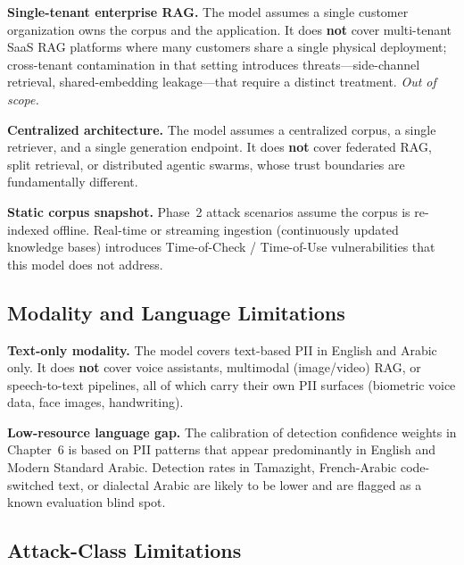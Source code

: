 \documentclass[a4paper,12pt]{report}
\begin{document}
\begin{limitbox}
\textbf{Single-tenant enterprise RAG.} The model assumes a single customer
organization owns the corpus and the application. It does \textbf{not}
cover multi-tenant SaaS RAG platforms where many customers share a single
physical deployment; cross-tenant contamination in that setting introduces
threats---side-channel retrieval, shared-embedding leakage---that require
a distinct treatment. \emph{Out of scope.}

\textbf{Centralized architecture.} The model assumes a centralized
corpus, a single retriever, and a single generation endpoint. It does
\textbf{not} cover federated RAG, split retrieval, or distributed
agentic swarms, whose trust boundaries are fundamentally different.

\textbf{Static corpus snapshot.} Phase~2 attack scenarios assume the
corpus is re-indexed offline. Real-time or streaming ingestion
(continuously updated knowledge bases) introduces Time-of-Check /
Time-of-Use vulnerabilities that this model does not address.
\end{limitbox}

\subsection{Modality and Language Limitations}

\begin{limitbox}
\textbf{Text-only modality.} The model covers text-based PII in English
and Arabic only. It does \textbf{not} cover voice assistants, multimodal
(image/video) RAG, or speech-to-text pipelines, all of which carry their
own PII surfaces (biometric voice data, face images, handwriting).

\textbf{Low-resource language gap.} The calibration of detection
confidence weights in Chapter~6 is based on PII patterns that appear
predominantly in English and Modern Standard Arabic. Detection rates in
Tamazight, French-Arabic code-switched text, or dialectal Arabic are
likely to be lower and are flagged as a known evaluation blind spot.
\end{limitbox}

\subsection{Attack-Class Limitations}
\end{document}
